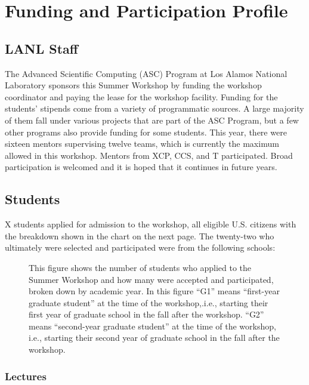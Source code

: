 \chapter{Funding and Participation Profile}

\section{LANL Staff}

The Advanced Scientific Computing (ASC) Program at Los Alamos National
Laboratory sponsors this Summer Workshop by funding the workshop
coordinator and paying the lease for the workshop facility.  Funding
for the students' stipends come from a variety of programmatic
sources.  A large majority of them fall under various projects that
are part of the ASC Program, but a few other programs also provide
funding for some students.  This year, there were sixteen mentors
supervising twelve teams, which is currently the maximum allowed in
this workshop.  Mentors from XCP, CCS, and T participated.  Broad participation is welcomed and it is hoped that
it continues in future years.


\section{Students}

X students applied for
admission to the workshop, all eligible U.S. citizens with the
breakdown shown in the chart on the next page.  The twenty-two who
ultimately were selected and participated were from the following
schools: 

\begin{figure}
\centering
{}
\caption{This figure shows the number of students who applied to the
  Summer Workshop and how many were accepted and participated, broken
  down by academic year.  In this figure ``G1'' means ``first-year
  graduate student'' at the time of the workshop,.i.e., starting their
  first year of graduate school in the fall after the workshop. ``G2''
  means ``second-year graduate student'' at the time of the workshop,
  i.e., starting their second year of graduate school in the fall
  after the workshop.}
\end{figure}

\subsection{Lectures}

